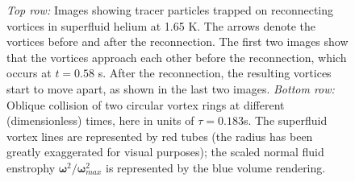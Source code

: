 \documentclass[9pt,twocolumn,twoside]{pnas-new}
\newcommand{\bom}{\boldsymbol{\omega}}
\providecommand{\DIFaddendFL}{} %
\DeclareRobustCommand{\DIFaddendFL}{\DIFOaddendFL \let\includegraphics\DIFOincludegraphics} %
\begin{document}
\begin{figure}
	\DIFaddendFL \caption{\emph{Top row:} Images showing tracer particles trapped on reconnecting vortices in superfluid helium at 1.65 K. The arrows denote the vortices before and after the reconnection. The first two images show that the vortices approach each other before the reconnection, which occurs at $t=0.58$ s. After the reconnection, the resulting vortices start to move apart, as shown in the last two images.
	\emph{Bottom row:} Oblique collision of two circular vortex rings at different 
	(dimensionless) times, here in units of $\tau=0.183$s.
	The superfluid vortex lines are represented by red tubes (the radius has been greatly 
	exaggerated for visual purposes); the scaled normal fluid enstrophy 
	$\bom^2/\bom^2_{max}$ is represented by the blue volume rendering.}
	\label{fig:ring-coll-viz}
\end{figure}
\end{document}
